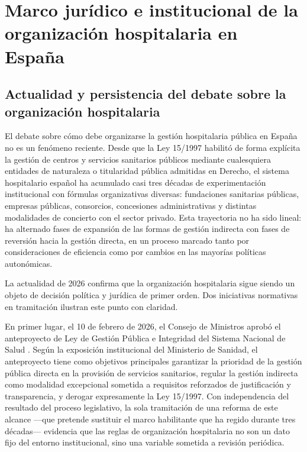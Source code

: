 \chapter{Marco jurídico e institucional de la organización hospitalaria en España}
\label{ch:juridico}


\section{Actualidad y persistencia del debate sobre la organización hospitalaria}
\label{sec:actualidad}

El debate sobre cómo debe organizarse la gestión hospitalaria pública en España no es un fenómeno reciente. Desde que la Ley 15/1997 habilitó de forma explícita la gestión de centros y servicios sanitarios públicos mediante cualesquiera entidades de naturaleza o titularidad pública admitidas en Derecho, el sistema hospitalario español ha acumulado casi tres décadas de experimentación institucional con fórmulas organizativas diversas: fundaciones sanitarias públicas, empresas públicas, consorcios, concesiones administrativas y distintas modalidades de concierto con el sector privado. Esta trayectoria no ha sido lineal: ha alternado fases de expansión de las formas de gestión indirecta con fases de reversión hacia la gestión directa, en un proceso marcado tanto por consideraciones de eficiencia como por cambios en las mayorías políticas autonómicas.

La actualidad de 2026 confirma que la organización hospitalaria sigue siendo un objeto de decisión política y jurídica de primer orden. Dos iniciativas normativas en tramitación ilustran este punto con claridad.

En primer lugar, el 10 de febrero de 2026, el Consejo de Ministros aprobó el anteproyecto de Ley de Gestión Pública e Integridad del Sistema Nacional de Salud \citep{ministerio2026gestion}. Según la exposición institucional del Ministerio de Sanidad, el anteproyecto tiene como objetivos principales garantizar la prioridad de la gestión pública directa en la provisión de servicios sanitarios, regular la gestión indirecta como modalidad excepcional sometida a requisitos reforzados de justificación y transparencia, y derogar expresamente la Ley 15/1997. Con independencia del resultado del proceso legislativo, la sola tramitación de una reforma de este alcance ---que pretende sustituir el marco habilitante que ha regido durante tres décadas--- evidencia que las reglas de organización hospitalaria no son un dato fijo del entorno institucional, sino una variable sometida a revisión periódica.


